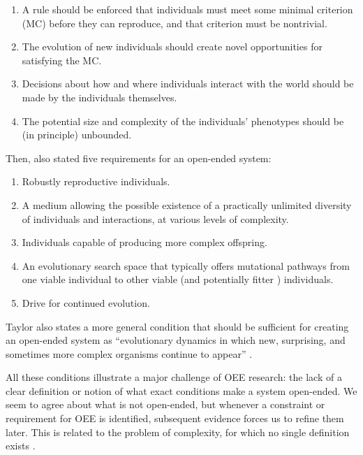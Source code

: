 \begin{enumerate}
  \item A rule should be enforced that individuals must meet some minimal
        criterion (MC) before they can reproduce, and that criterion must be
        nontrivial.
  \item The evolution of new individuals should create novel opportunities for
        satisfying the MC.
  \item Decisions about how and where individuals interact with the world should
        be made by the individuals themselves.
  \item The potential size and complexity of the individuals' phenotypes should
        be (in principle) unbounded.
\end{enumerate}
Then, \textcite{taylorRequirementsOpenEndedEvolution2015} also stated five
requirements for an open-ended system:

\begin{enumerate}
  \item Robustly reproductive individuals.
  \item A medium allowing the possible existence of a practically unlimited
        diversity of individuals and interactions, at various levels of
        complexity.
  \item Individuals capable of producing more complex offspring.
  \item An evolutionary search space that typically offers mutational pathways
        from one viable individual to other viable (and potentially fitter )
        individuals.
  \item Drive for continued evolution.
\end{enumerate}
Taylor also states a more general condition that should be sufficient for
creating an open-ended system as ``evolutionary dynamics in which new,
surprising, and sometimes more complex organisms continue to appear''
\parencite{taylorRequirementsOpenEndedEvolution2015,
  taylorOpenEndedEvolutionPerspectives2016}.

All these conditions illustrate a major challenge of \ac{OEE} research: the lack
of a clear definition or notion of what exact conditions make a system
open-ended. We seem to agree about what is not open-ended, but whenever a
constraint or requirement for \ac{OEE} is identified, subsequent evidence forces
us to refine them later. This is related to the problem of complexity, for which
no single definition exists \parencite{johnsonSimplyComplexityClear2009}.

